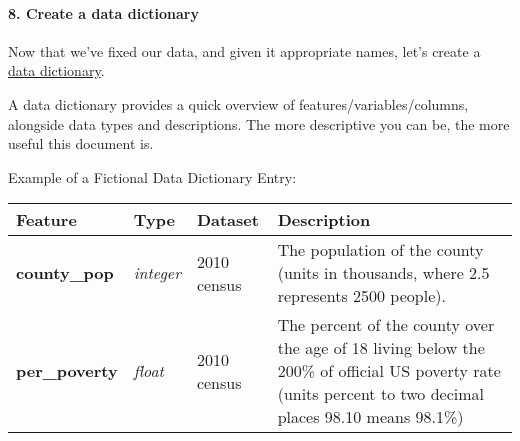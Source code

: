 \documentclass[11pt]{article}
\begin{document}
    \paragraph{8. Create a data dictionary}\label{create-a-data-dictionary}

Now that we've fixed our data, and given it appropriate names, let's
create a \href{http://library.ucmerced.edu/node/10249}{data dictionary}.

A data dictionary provides a quick overview of
features/variables/columns, alongside data types and descriptions. The
more descriptive you can be, the more useful this document is.

Example of a Fictional Data Dictionary Entry:

\begin{longtable}[]{@{}llll@{}}
\toprule
\begin{minipage}[b]{0.05\columnwidth}\raggedright\strut
Feature\strut
\end{minipage} & \begin{minipage}[b]{0.05\columnwidth}\raggedright\strut
Type\strut
\end{minipage} & \begin{minipage}[b]{0.05\columnwidth}\raggedright\strut
Dataset\strut
\end{minipage} & \begin{minipage}[b]{0.05\columnwidth}\raggedright\strut
Description\strut
\end{minipage}\tabularnewline
\midrule
\endhead
\begin{minipage}[t]{0.05\columnwidth}\raggedright\strut
\textbf{county\_pop}\strut
\end{minipage} & \begin{minipage}[t]{0.05\columnwidth}\raggedright\strut
\emph{integer}\strut
\end{minipage} & \begin{minipage}[t]{0.05\columnwidth}\raggedright\strut
2010 census\strut
\end{minipage} & \begin{minipage}[t]{0.05\columnwidth}\raggedright\strut
The population of the county (units in thousands, where 2.5 represents
2500 people).\strut
\end{minipage}\tabularnewline
\begin{minipage}[t]{0.05\columnwidth}\raggedright\strut
\textbf{per\_poverty}\strut
\end{minipage} & \begin{minipage}[t]{0.05\columnwidth}\raggedright\strut
\emph{float}\strut
\end{minipage} & \begin{minipage}[t]{0.05\columnwidth}\raggedright\strut
2010 census\strut
\end{minipage} & \begin{minipage}[t]{0.05\columnwidth}\raggedright\strut
The percent of the county over the age of 18 living below the 200\% of
official US poverty rate (units percent to two decimal places 98.10
means 98.1\%)\strut
\end{minipage}\tabularnewline
\bottomrule
\end{longtable}
\end{document}
